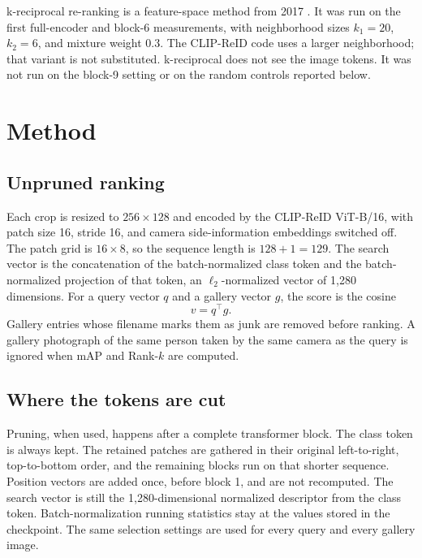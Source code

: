 \documentclass[11pt]{article}
\begin{document}
k-reciprocal re-ranking is a feature-space method from 2017 \cite{zhong2017kreciprocal}.
It was run on the first full-encoder and block-6 measurements, with neighborhood sizes $k_1{=}20$, $k_2{=}6$, and mixture weight $0.3$.
The CLIP-ReID code uses a larger neighborhood; that variant is not substituted.
k-reciprocal does not see the image tokens.
It was not run on the block-9 setting or on the random controls reported below.

\section{Method}
\subsection{Unpruned ranking}
Each crop is resized to $256 \times 128$ and encoded by the CLIP-ReID ViT-B/16, with patch size 16, stride 16, and camera side-information embeddings switched off.
The patch grid is $16 \times 8$, so the sequence length is $128 + 1 = 129$.
The search vector is the concatenation of the batch-normalized class token and the batch-normalized projection of that token, an $\ell_2$-normalized vector of 1{,}280 dimensions.
For a query vector $q$ and a gallery vector $g$, the score is the cosine
\begin{equation}
v = q^{\top} g.
\end{equation}
Gallery entries whose filename marks them as junk are removed before ranking.
A gallery photograph of the same person taken by the same camera as the query is ignored when mAP and Rank-$k$ are computed.

\subsection{Where the tokens are cut}
Pruning, when used, happens after a complete transformer block.
The class token is always kept.
The retained patches are gathered in their original left-to-right, top-to-bottom order, and the remaining blocks run on that shorter sequence.
Position vectors are added once, before block 1, and are not recomputed.
The search vector is still the 1{,}280-dimensional normalized descriptor from the class token.
Batch-normalization running statistics stay at the values stored in the checkpoint.
The same selection settings are used for every query and every gallery image.
\end{document}
